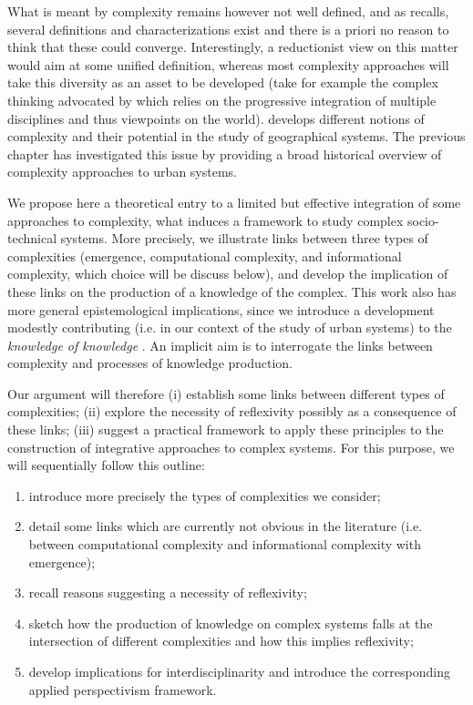 What is meant by complexity remains however not well defined, and as \cite{chu2008criteria} recalls, several definitions and characterizations exist and there is a priori no reason to think that these could converge. Interestingly, a reductionist view on this matter would aim at some unified definition, whereas most complexity approaches will take this diversity as an asset to be developed (take for example the complex thinking advocated by \cite{morin1991methode} which relies on the progressive integration of multiple disciplines and thus viewpoints on the world). \cite{manson2001simplifying} develops different notions of complexity and their potential in the study of geographical systems. The previous chapter \cite{batty2018which} has investigated this issue by providing a broad historical overview of complexity approaches to urban systems. 


We propose here a theoretical entry to a limited but effective integration of some approaches to complexity, what induces a framework to study complex socio-technical systems. More precisely, we illustrate links between three types of complexities (emergence, computational complexity, and informational complexity, which choice will be discuss below), and develop the implication of these links on the production of a knowledge of the complex. This work also has more general epistemological implications, since we introduce a development modestly contributing (i.e. in our context of the study of urban systems) to the \emph{knowledge of knowledge} \cite{edgar1986methode}. An implicit aim is to interrogate the links between complexity and processes of knowledge production.


Our argument will therefore (i) establish some links between different types of complexities; (ii) explore the necessity of reflexivity possibly as a consequence of these links; (iii) suggest a practical framework to apply these principles to the construction of integrative approaches to complex systems. For this purpose, we will sequentially follow this outline:
\begin{enumerate}
	\item introduce more precisely the types of complexities we consider;
	\item detail some links which are currently not obvious in the literature (i.e. between computational complexity and informational complexity with emergence);
	\item recall reasons suggesting a necessity of reflexivity;
	\item sketch how the production of knowledge on complex systems falls at the intersection of different complexities and how this implies reflexivity;
	\item develop implications for interdisciplinarity and introduce the corresponding applied perspectivism framework.
\end{enumerate}








